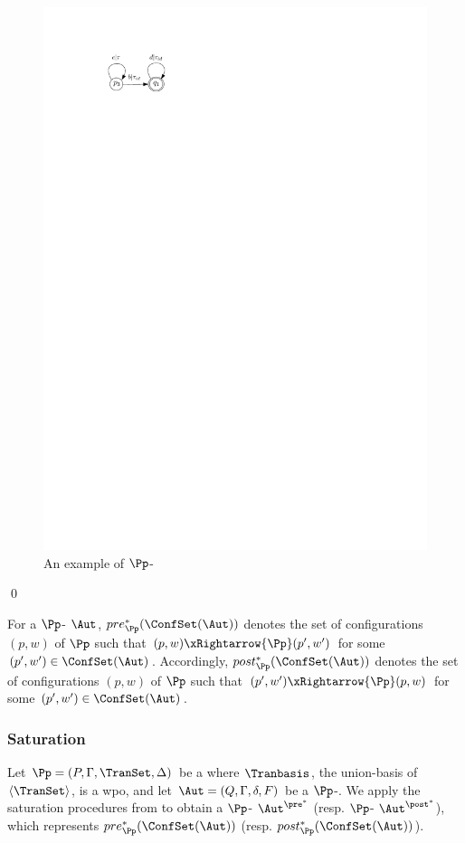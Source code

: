 \begin{example}
\begin{figure}[htb]
	\includegraphics[scale = 0.9]{pwpotrnfa-example.pdf}
	\caption{An example of $\Pp$-\WOTrNFA}\label{fig-ptrnfa-exmp}
\end{figure}
\qed
\end{example}

For a $\Pp$-{\WOTrNFA} $\Aut$, $pre^*_\Pp(\ConfSet(\Aut))$  denotes the set of configurations $(p, w)$ of $\Pp$ such that $(p, w) \xRightarrow{\Pp} (p', w')$ for some $(p', w') \in \ConfSet(\Aut)$. Accordingly, $post^*_\Pp(\ConfSet(\Aut))$ denotes the set of configurations $(p, w)$ of $\Pp$ such that $(p', w') \xRightarrow{\Pp} (p, w)$ for some $(p', w') \in \ConfSet(\Aut)$.





\subsubsection{Saturation} \label{sect:decidability}
Let $\Pp = (P, \Gamma, \TranSet, \Delta)$ be a  {\WOTrPDS} where $\Tranbasis$, the union-basis of  $\langle \TranSet \rangle$, is a wpo, and let $\Aut = (Q, \Gamma, \delta, F)$ be a $\Pp$-{\NFA}. %
We apply the saturation procedures from \cite{SM+15,Song18} to obtain a $\Pp$-{\WOTrNFA} $\Aut^{\pre^*}$ (resp. $\Pp$-{\WOTrNFA} $\Aut^{\post^*}$), which represents $pre^*_\Pp(\ConfSet(\Aut))$ (resp. $post^*_\Pp(\ConfSet(\Aut))$).

